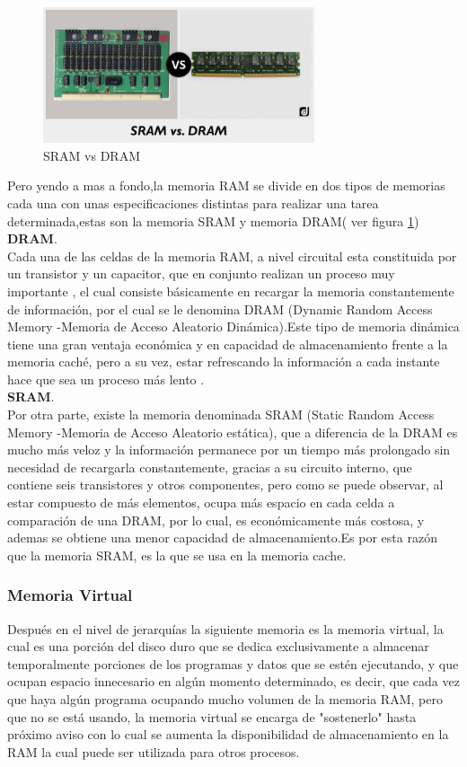 \documentclass{article}
\begin{document}
\begin{figure}[h]
\includegraphics[width=8cm]{vs.jpg}
\centering
\caption{SRAM vs DRAM}
\label{vs}
\end{figure}

Pero yendo a mas a fondo,la memoria RAM se divide en dos tipos de memorias cada una con unas especificaciones distintas para realizar una tarea determinada,estas son la memoria SRAM  y memoria DRAM( ver figura \ref{vs}) \\

\textbf{DRAM}.\\
Cada una de las celdas de la memoria RAM, a nivel circuital esta constituida por un transistor y un capacitor, que en conjunto realizan un proceso muy importante , el cual consiste básicamente en recargar la memoria constantemente de información, por el cual se le denomina DRAM (Dynamic Random Access Memory -Memoria de Acceso Aleatorio Dinámica).Este tipo de memoria dinámica tiene una gran ventaja económica y en capacidad de almacenamiento frente a la memoria caché, pero a su vez, estar refrescando la información a cada instante hace que sea un proceso más  lento \cite{augusto}.\\

\noindent
\textbf{SRAM}.\\
Por otra parte, existe la memoria denominada SRAM (Static Random Access Memory -Memoria de Acceso Aleatorio estática), que a diferencia de la DRAM es mucho más veloz y la información permanece por un tiempo más prolongado sin necesidad de recargarla constantemente, gracias a su circuito interno, que contiene seis transistores y otros componentes, pero como se puede observar, al estar compuesto de más elementos, ocupa más espacio en cada celda a comparación de una DRAM, por lo cual, es económicamente más costosa, y ademas se obtiene una menor capacidad de almacenamiento.Es por esta razón que la memoria SRAM, es la que se usa en la memoria cache.


\subsubsection{Memoria Virtual}
Después en el nivel de jerarquías la siguiente memoria es la memoria virtual, la cual es una porción del disco duro que se dedica exclusivamente a almacenar temporalmente porciones de los programas y datos que se estén ejecutando, y que ocupan espacio innecesario en algún momento determinado, es decir, que cada vez que haya algún programa ocupando mucho volumen de la memoria RAM, pero que no se está usando, la memoria virtual se encarga de "sostenerlo" hasta próximo aviso con lo cual se aumenta la disponibilidad de almacenamiento en la RAM la cual puede ser utilizada para otros procesos\cite{augusto}.
\end{document}
